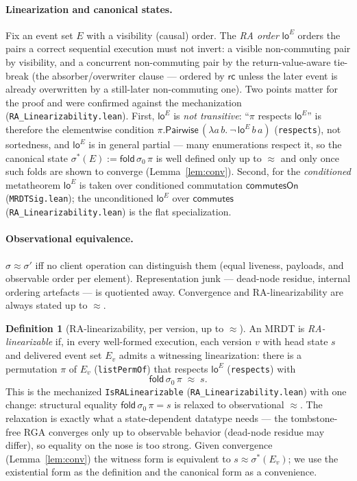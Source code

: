 \documentclass[11pt]{article}
\theoremstyle{definition}
\newtheorem{definition}{Definition}
\theoremstyle{remark}
\newcommand{\st}{\sigma}
\newcommand{\ini}{\st_0}
\newcommand{\eqobs}{\approx}
\newcommand{\loE}{\mathsf{lo}^{E}}
\newcommand{\fold}{\mathsf{fold}}
\newcommand{\sigmacan}{\st^{\ast}}
\newcommand{\lean}[1]{\texttt{#1}}
\begin{document}
\paragraph{Linearization and canonical states.} Fix an event set $E$ with a visibility
(causal) order. The \emph{RA order} $\loE$ orders the pairs a correct sequential execution
must not invert: a visible non-commuting pair by visibility, and a concurrent non-commuting
pair by the return-value-aware tie-break (the absorber/overwriter clause --- ordered by
$\mathsf{rc}$ unless the later event is already overwritten by a still-later non-commuting
one). Two points matter for the proof and were confirmed against the mechanization
(\lean{RA\_Linearizability.lean}). First, $\loE$ is \emph{not transitive}: ``$\pi$ respects
$\loE$'' is therefore the elementwise condition
$\pi.\mathsf{Pairwise}\,(\lambda a\,b.\ \neg\,\loE\,b\,a)$ (\lean{respects}), not sortedness,
and $\loE$ is in general partial --- many enumerations respect it, so the canonical state
$\sigmacan(E) := \fold\,\ini\,\pi$ is well defined only up to $\eqobs$ and only once such
folds are shown to converge (Lemma~\ref{lem:conv}). Second, for the \emph{conditioned}
metatheorem $\loE$ is taken over conditioned commutation $\mathsf{commutesOn}$
(\lean{MRDTSig.lean}); the unconditioned $\loE$ over $\mathsf{commutes}$
(\lean{RA\_Linearizability.lean}) is the flat specialization.

\paragraph{Observational equivalence.} $\st \eqobs \st'$ iff no client operation can
distinguish them (equal liveness, payloads, and observable order per element). Representation
junk --- dead-node residue, internal ordering artefacts --- is quotiented away. Convergence
and RA-linearizability are always stated up to $\eqobs$.

\begin{definition}[RA-linearizability, per version, up to $\eqobs$]\label{def:ralin}
An MRDT is \emph{RA-linearizable} if, in every well-formed execution, each version $v$ with
head state $s$ and delivered event set $E_v$ admits a witnessing linearization: there is a
permutation $\pi$ of $E_v$ (\lean{listPermOf}) that respects $\loE$ (\lean{respects}) with
\[
  \fold\,\ini\,\pi \;\eqobs\; s .
\]
This is the mechanized \lean{IsRALinearizable} (\lean{RA\_Linearizability.lean}) with one
change: structural equality $\fold\,\ini\,\pi = s$ is relaxed to observational $\eqobs$. The
relaxation is exactly what a state-dependent datatype needs --- the tombstone-free RGA
converges only up to observable behavior (dead-node residue may differ), so equality on the
nose is too strong. Given convergence (Lemma~\ref{lem:conv}) the witness form is equivalent
to $s \eqobs \sigmacan(E_v)$; we use the existential form as the definition and the canonical
form as a convenience.
\end{definition}
\end{document}
